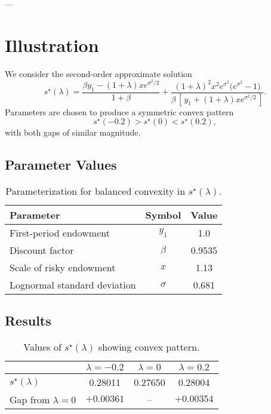 \documentclass[12pt]{article}
\begin{document}
---

\section{Illustration}


We consider the second-order approximate solution
\[
s^\star(\lambda)
=
\frac{\beta y_1 - (1+\lambda)x e^{\sigma^2/2}}{1+\beta}
+
\frac{(1+\lambda)^2 x^2 e^{\sigma^2}\!\big(e^{\sigma^2}-1\big)}
{\beta\,[\,y_1 + (1+\lambda)x e^{\sigma^2/2}\,]}.
\]
Parameters are chosen to produce a symmetric convex pattern
\[
s^\star(-0.2) > s^\star(0) < s^\star(0.2),
\]
with both gaps of similar magnitude.

\subsection*{Parameter Values}
\begin{table}[h!]
\centering
\begin{tabular}{lcc}
\hline
Parameter & Symbol & Value \\
\hline
First-period endowment & $y_1$ & 1.0 \\
Discount factor & $\beta$ & 0.9535 \\
Scale of risky endowment & $x$ & 1.13 \\
Lognormal standard deviation & $\sigma$ & 0.681 \\
\hline
\end{tabular}
\caption{Parameterization for balanced convexity in $s^\star(\lambda)$.}
\label{tab:param_balanced}
\end{table}

\subsection*{Results}

\begin{table}[h!]
\centering
\begin{tabular}{lccc}
\hline
 & $\lambda=-0.2$ & $\lambda=0$ & $\lambda=0.2$ \\
\hline
$s^\star(\lambda)$ & 0.28011 & 0.27650 & 0.28004 \\
Gap from $\lambda=0$ & $+0.00361$ & -- & $+0.00354$ \\
\hline
\end{tabular}
\caption{Values of $s^\star(\lambda)$ showing convex pattern.}
\label{tab:s_values}
\end{table}
\end{document}
